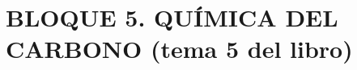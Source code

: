 \documentclass[twocolumn]{article}
\begin{document}
%
%
%
%
%
%
%
%
%
%
\section{BLOQUE 5. QUÍMICA DEL CARBONO (tema 5 del libro)}
\end{document}
